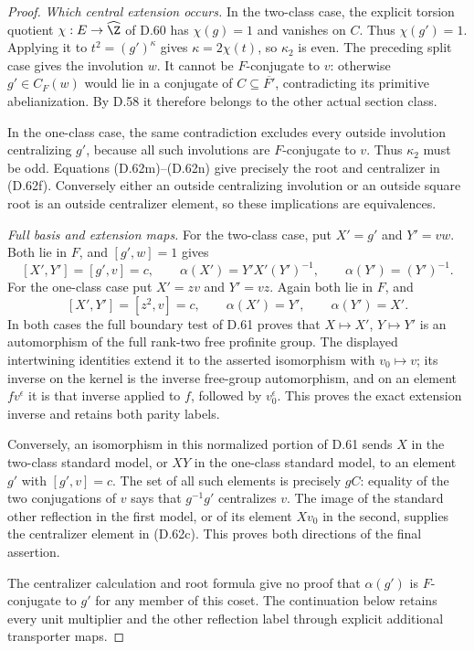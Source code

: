 \begin{proof}
\emph{Which central extension occurs.}
In the two-class case, the explicit torsion quotient
$\chi:E\to\widehat\Z$ of D.60 has
$\chi(g)=1$ and vanishes on $C$.
Thus $\chi(g')=1$.
Applying it to $t^2=(g')^\kappa$ gives
$\kappa=2\chi(t)$, so $\kappa_2$ is even.
The preceding split case gives the involution $w$.
It cannot be $F$-conjugate to $v$:
otherwise $g'\in C_F(w)$ would lie in a conjugate
of $C\subseteq\overline{F'}$, contradicting its
primitive abelianization. By D.58 it therefore
belongs to the other actual section class.

In the one-class case, the same contradiction
excludes every outside involution centralizing $g'$,
because all such involutions are $F$-conjugate to $v$.
Thus $\kappa_2$ must be odd.
Equations (D.62m)--(D.62n) give precisely the root
and centralizer in (D.62f). Conversely either an
outside centralizing involution or an outside
square root is an outside centralizer element,
so these implications are equivalences.

\emph{Full basis and extension maps.}
For the two-class case, put $X'=g'$ and $Y'=vw$.
Both lie in $F$, and $[g',w]=1$ gives
\[
 [X',Y']=[g',v]=c,\qquad
 \alpha(X')=Y'X'(Y')^{-1},\qquad
 \alpha(Y')=(Y')^{-1}.
                                                        \tag{D.62o}
\]
For the one-class case put $X'=zv$ and $Y'=vz$.
Again both lie in $F$, and
\[
 [X',Y']=[z^2,v]=c,\qquad
 \alpha(X')=Y',\qquad \alpha(Y')=X'.
                                                        \tag{D.62p}
\]
In both cases the full boundary test of D.61 proves
that $X\mapsto X'$, $Y\mapsto Y'$ is an automorphism
of the full rank-two free profinite group.
The displayed intertwining identities extend it
to the asserted isomorphism with $v_0\mapsto v$;
its inverse on the kernel is the inverse free-group
automorphism, and on an element $fv^\epsilon$ it is
that inverse applied to $f$, followed by
$v_0^\epsilon$. This proves the exact extension
inverse and retains both parity labels.

Conversely, an isomorphism in this normalized
portion of D.61 sends $X$ in the two-class standard
model, or $XY$ in the one-class standard model,
to an element $g'$ with $[g',v]=c$.
The set of all such elements is precisely $gC$:
equality of the two conjugations of $v$ says that
$g^{-1}g'$ centralizes $v$.
The image of the standard other reflection in the
first model, or of its element $Xv_0$ in the second,
supplies the centralizer element in (D.62c).
This proves both directions of the final assertion.

The centralizer calculation and root formula give
no proof that $\alpha(g')$ is $F$-conjugate to $g'$
for any member of this coset. The continuation below
retains every unit multiplier and the other reflection
label through explicit additional transporter maps.
\end{proof}

